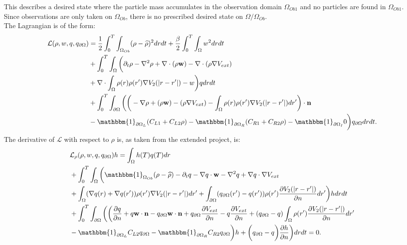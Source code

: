 This describes a desired state where the particle mass accumulates in the observation domain $\Omega_{Ob1}$ and no particles are found in $\Omega_{Ob1}$. Since observations are only taken on $\Omega_{Ob}$, there is no prescribed desired state on $\Omega / \Omega_{Ob}$.\\
The Lagrangian is of the form:
\begin{align*}
\mathcal{L}(\rho,w,\Adjb,\Adjc ) &=\frac{1}{2} \int_0^T \int_{\Omega_{Ob}} (\rho - \widehat \rho)^2 dr dt + \frac{\beta}{2}\int_0^T \int_\Omega w^2 drdt \\
&+ \int_0^T \int_\Omega \bigg( \partial_t \rho - \nabla^2 \rho + \nabla \cdot (\rho \mathbf{w}) -\nabla \cdot (\rho \nabla V_{ext}) \\
&+ \nabla \cdot \int_\Omega \rho(r) \rho(r') \nabla V_2(|r-r'|) -w \bigg) \Adjb dr dt\\
&+ \int_0^T \int_{\partial \Omega} \bigg(  \bigg(-\nabla \rho+ (\rho \mathbf{w}) -(\rho \nabla V_{ext}) -  \int_\Omega \rho(r) \rho(r') \nabla V_2(|r-r'|) dr' \bigg)\cdot \n\\
&  -\mathbbm{1}_{\partial \Omega_L}( C_{L1}  + C_{L2}\rho) -\mathbbm{1}_{\partial \Omega_R} ( C_{R1}  + C_{R2}\rho) -\mathbbm{1}_{\partial \Omega_I} 0 \bigg) \Adjc dr dt.
\end{align*}
The derivative of $\mathcal{L}$ with respect to $\rho$ is, as taken from the extended project, is:
\begin{align*}
&\mathcal{L}_\rho (\rho,{w},\Adjb,\Adjc)h=
\int_\Omega h(T) \Adjb(T) dr\\
&+ \int_0^T \int_\Omega \bigg( \mathbbm{1}_{ \Omega_{Ob}} (\rho- \widehat{\rho})  - \partial_t \Adjb  - \nabla \Adjb \cdot \mathbf{w}  - \nabla^2 \Adjb \notag 
+  \nabla \Adjb \cdot \nabla V_{ext}  \notag \\
&+ \int_\Omega (\nabla  \Adjb(r)+\nabla  \Adjb(r')) \rho(r') \nabla V_2(|r-r'|) dr'+ \int_{\partial \Omega} ( \Adjc(r') - \Adjb(r')) \rho(r')   \frac{\partial V_2(|r-r'|)}{\partial n} dr' \bigg) h dr dt \\
&+  \int_0^T\int_{\partial \Omega}  \bigg(
\bigg(\frac{\partial \Adjb }{\partial n} + \Adjb  \mathbf{w} \cdot \mathbf{n} - \Adjc \mathbf{w} \cdot \mathbf{n}  +  \Adjc \dfrac{\partial V_{ext}}{\partial n} - \Adjb \frac{\partial V_{ext}}{\partial n} + ( \Adjc - \Adjb)  \int_\Omega \rho(r') \frac{\partial V_2(|r-r'|)}{\partial n} dr'\\
& -\mathbbm{1}_{\partial \Omega_L} C_{L2} \Adjc   -\mathbbm{1}_{\partial \Omega_R} C_{R2} \Adjc \bigg)h + \bigg( \Adjc- \Adjb \bigg) \frac{\partial h}{\partial n} \bigg) dr dt =0.
\end{align*}
